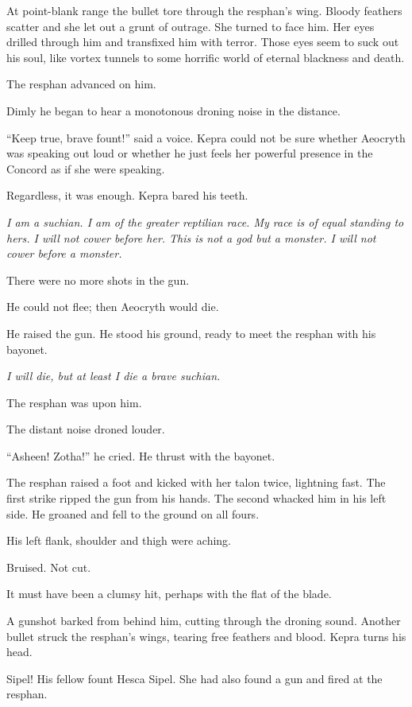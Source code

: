 \documentclass
  [a4paper,
   12pt,
   oneside
  ]%
  {article}
\begin{document}
At point-blank range the bullet tore through the resphan’s wing. 
Bloody feathers scatter and she let out a grunt of outrage. 
She turned to face him. 
Her eyes drilled through him and transfixed him with terror. 
Those eyes seem to suck out his soul, like vortex tunnels to some horrific world of eternal blackness and death. 

The resphan advanced on him. 

Dimly he began to hear a monotonous droning noise in the distance.

``Keep true, brave fount!'' said a voice. Kepra could not be sure whether Aeocryth was speaking out loud or whether he just feels her powerful presence in the Concord as if she were speaking. 

Regardless, it was enough. Kepra bared his teeth. 

\emph{I am a suchian. I am of the greater reptilian race. My race is of equal standing to hers. I will not cower before her. This is not a god but a monster. I will not cower before a monster.}

There were no more shots in the gun. 

He could not flee; then Aeocryth would die. 

He raised the gun. He stood his ground, ready to meet the resphan with his bayonet. 

\emph{I will die, but at least I die a brave suchian.} 

The resphan was upon him.

The distant noise droned louder.

``Asheen! Zotha!'' he cried. He thrust with the bayonet.

The resphan raised a foot and kicked with her talon twice, lightning fast. 
The first strike ripped the gun from his hands. 
The second whacked him in his left side. He groaned and fell to the ground on all fours. 

His left flank, shoulder and thigh were aching. 

Bruised. Not cut. 

It must have been a clumsy hit, perhaps with the flat of the blade. 

A gunshot barked from behind him, cutting through the droning sound. 
Another bullet struck the resphan’s wings, tearing free feathers and blood. 
Kepra turns his head. 

Sipel! His fellow fount Hesca Sipel. She had also found a gun and fired at the resphan.
\end{document}
